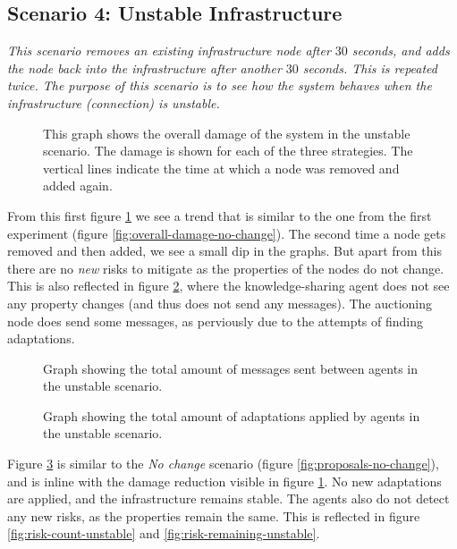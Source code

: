 \subsection{Scenario 4: Unstable Infrastructure}
\textit{This scenario removes an existing infrastructure node after $30$ seconds, and adds the node back into the infrastructure after another $30$ seconds. This is repeated twice. The purpose of this scenario is to see how the system behaves when the infrastructure (connection) is unstable.}

\begin{figure}[H]
    \centering
    
    \caption{This graph shows the overall damage of the system in the unstable scenario. The damage is shown for each of the three strategies. The vertical lines indicate the time at which a node was removed and added again.}
    \label{fig:overall-damage-unstable}
\end{figure}

From this first figure \ref{fig:overall-damage-unstable} we see a trend that is similar to the one from the first experiment (figure \ref{fig:overall-damage-no-change}). The second time a node gets removed and then added, we see a small dip in the graphs. But apart from this there are no \emph{new} risks to mitigate as the properties of the nodes do not change. This is also reflected in figure \ref{fig:messages-unstable}, where the knowledge-sharing agent does not see any property changes (and thus does not send any messages). The auctioning node does send some messages, as perviously due to the attempts of finding adaptations.

\begin{figure}[H]
    \centering
    
    \caption{Graph showing the total amount of messages sent between agents in the unstable scenario.}
    \label{fig:messages-unstable}
\end{figure}

\begin{figure}[H]
    \centering
    
    \caption{Graph showing the total amount of adaptations applied by agents in the unstable scenario.}
    \label{fig:proposals-unstable}
\end{figure}

Figure \ref{fig:proposals-unstable} is similar to the \emph{No change} scenario (figure \ref{fig:proposals-no-change}), and is inline with the damage reduction visible in figure \ref{fig:overall-damage-unstable}. No new adaptations are applied, and the infrastructure remains stable. The agents also do not detect any new risks, as the properties remain the same. This is reflected in figure \ref{fig:risk-count-unstable} and \ref{fig:risk-remaining-unstable}.

